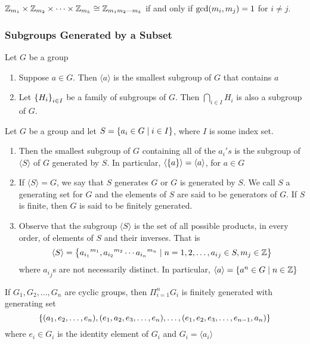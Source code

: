 \begin{corollary}
    $\mathbb{Z}_{m_1} \times \mathbb{Z}_{m_2} \times \cdots \times \mathbb{Z}_{m_k} \cong \mathbb{Z}_{m_1m_2\cdots m_k}$ if and only if $\text{gcd} \qty(m_i, m_j) = 1$ for $i \neq j$.
\end{corollary}

\subsubsection{Subgroups Generated by a Subset}


\begin{recall} Let $G$ be a group
    \begin{enumerate}
        \item Suppose $a \in G$. Then $\langle a \rangle$ is the smallest subgroup of $G$ that contains $a$
        \item Let $\qty{H_i}_{i \in I}$ be a family of subgroups of $G$. Then $\bigcap_{i \in I} H_i$ is also a subgroup of $G$. 
    \end{enumerate}
\end{recall}

\begin{remark}
    Let $G$ be a group and let $S = \qty{a_i \in G \mid i \in I}$, where $I$ is some index set. 
    \begin{enumerate}
        \item Then the smallest subgroup of $G$ containing all of the $a_i's$ is the subgroup of $\langle S \rangle$ of $G$ generated by $S$. In particular, $\langle \qty{a} \rangle = \langle a \rangle$, for $a \in G$
        \item  If $\langle S \rangle = G$, we say that $S$ generates $G$ or $G$ is generated by $S$. We call $S$ a generating set for $G$ and the elements of $S$ are said to be generators of $G$. If $S$ is finite, then $G$ is said to be finitely generated.
        \item  Observe that the subgroup $\langle S \rangle$ is the set of all possible products, in every order, of elements of $S$ and their inverses. That is
        \[ \langle S \rangle = \qty{{a_{i_1}}^{m_1}, {a_{i_2}}^{m_2} \cdots {a_{i_n}}^{m_n} \mid n = 1, 2, \ldots, {a_i}_j \in S, m_j \in \mathbb{Z}}\]
        where ${a_i}_j$s are not necessarily distinct. In particular, $\langle a \rangle = \qty{a^n \in G \mid n \in \mathbb{Z}}$
    \end{enumerate}
\end{remark}

\begin{remark}
    If $G_1, G_2, \ldots, G_n$ are cyclic groups, then $\Pi_{i=1}^{n} G_i$ is finitely generated with generating set
    \[ \qty{\qty(a_1, e_2, \ldots, e_n), \qty(e_1, a_2, e_3, \ldots, e_n), \ldots, \qty(e_1, e_2, e_3, \ldots, e_{n-1}, a_n)} \]
    where $e_i \in G_i$ is the identity element of $G_i$ and $G_i = \langle a_i \rangle$
\end{remark}

